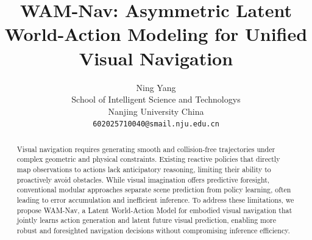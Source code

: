 \documentclass{article}
\title{WAM-Nav: Asymmetric Latent World-Action Modeling for Unified Visual Navigation}
\author{
  Ning Yang\\
  School of Intelligent Science and Technologys\\
  Nanjing University
  China\\
  \texttt{602025710040@smail.nju.edu.cn} \\
}
\begin{document}
\maketitle
\begin{abstract}
    Visual navigation requires generating smooth and collision-free trajectories under complex geometric and physical constraints. Existing reactive policies that directly map observations to actions lack anticipatory reasoning, limiting their ability to proactively avoid obstacles. While visual imagination offers predictive foresight, conventional modular approaches separate scene prediction from policy learning, often leading to error accumulation and inefficient inference.
    To address these limitations, we propose WAM-Nav, a Latent World-Action Model for embodied visual navigation that jointly learns action generation and latent future visual prediction, enabling more robust and foresighted navigation decisions without compromising inference efficiency.

\end{abstract}
\end{document}
